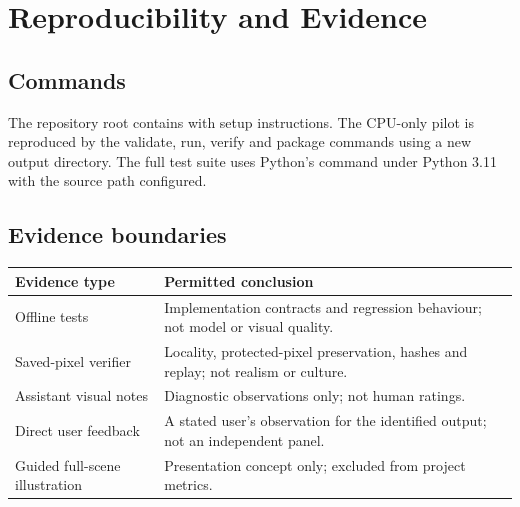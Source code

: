 \section{Reproducibility and Evidence}
\subsection{Commands}
The repository root contains  with setup instructions. The CPU-only pilot is reproduced by the  validate, run, verify and package commands using a new output directory. The full test suite uses Python's  command under Python 3.11 with the source path configured.

\subsection{Evidence boundaries}
\begin{table}[htbp]
\centering
\begin{tabularx}{\textwidth}{p{}Y}
\toprule
Evidence type & Permitted conclusion\\\midrule
Offline tests & Implementation contracts and regression behaviour; not model or visual quality.\\
Saved-pixel verifier & Locality, protected-pixel preservation, hashes and replay; not realism or culture.\\
Assistant visual notes & Diagnostic observations only; not human ratings.\\
Direct user feedback & A stated user's observation for the identified output; not an independent panel.\\
Guided full-scene illustration & Presentation concept only; excluded from project metrics.\\
\bottomrule
\end{tabularx}
\end{table}
